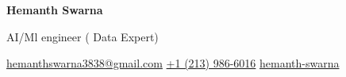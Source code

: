 \documentclass{article}
\newenvironment{header}{
    \vspace*{-0.5cm}
    \centering\linespread{1.2}
}{
    \vspace{-0.2cm}
}
\let\hrefWithoutArrow\href
\begin{document}
\begin{header}
    \textbf{\fontsize{20pt}{20pt}\selectfont Hemanth Swarna}

    \vspace{0.15cm}
    {\large AI/Ml engineer ( Data Expert)}
    \vspace{0.15cm}

    \begin{center}
        {\footnotesize
            \hrefWithoutArrow{mailto:hemanthswarna3838@gmail.com}{\faEnvelope[regular] \hspace{0.08cm}hemanthswarna3838@gmail.com}
            \quad
            \hrefWithoutArrow{tel:+12139866016}{\faPhone* \hspace{0.08cm}+1 (213) 986-6016}
            \quad
            \hrefWithoutArrow{https://www.linkedin.com/in/swarna-hemanth}{\faLinkedinIn \hspace{0.08cm}hemanth-swarna}
        }
    \end{center}
\end{header}

\vspace{-0.2cm}
\end{document}
